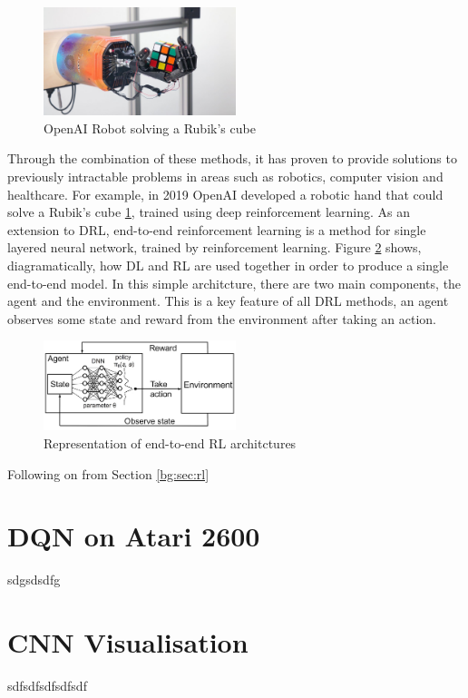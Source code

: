 \begin{figure}[htbp]
	\centering
	\includegraphics[width=0.5\textwidth]{chapters/chapter2/images/openai-robot.jpg}
	\caption{OpenAI Robot solving a Rubik's cube
		\label{fig:openai-robot}
	}
\end{figure}

Through the combination of these methods, it has proven to provide solutions to previously intractable problems \cite{rl-survey} in areas such as robotics, computer vision and healthcare. For example, in 2019 OpenAI developed a robotic hand that could solve a Rubik's cube \ref{fig:openai-robot}, trained using deep reinforcement learning. As an extension to DRL, end-to-end reinforcement learning is a method for single layered neural network, trained by reinforcement learning. Figure \ref{fig:e2e-rl} shows, diagramatically, how DL and RL are used together in order to produce a single end-to-end model. In this simple architcture, there are two main components, the agent and the environment. This is a key feature of all DRL methods, an agent observes some state and reward from the environment after taking an action.

\begin{figure}[htbp]
	\centering
	\includegraphics[width=0.5\textwidth]{chapters/chapter2/images/e2e-rl.jpg}
	\caption{Representation of end-to-end RL architctures
		\label{fig:e2e-rl}
	}
\end{figure}

Following on from Section \ref{bg:sec:rl}

\section{DQN on Atari 2600}
\label{bg:sec:dqn}
sdgsdsdfg

\section{CNN Visualisation}
\label{bg:sec:cnn-vis}
sdfsdfsdfsdfsdf